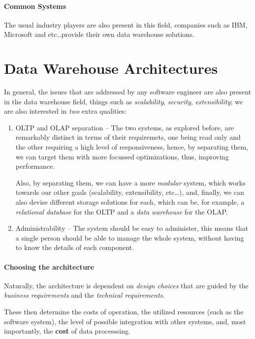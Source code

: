 \documentclass[openright, twoside, twocolumn]{report}
\begin{document}
\paragraph{Common Systems}
The usual industry players are also present in this field, companies such as
IBM, Microsoft and etc\dots provide their own data warehouse solutions.

\section{Data Warehouse Architectures}
In general, the issues that are addressed by any software engineer are
also present in the data warehouse field, things such as \emph{scalability},
\emph{security}, \emph{extensibility}; we are also interested in
\emph{two} extra qualities:

\begin{enumerate}
  \item OLTP and OLAP separation -- The two systems, as explored before,
  are remarkably distinct in terms of their requiremets, one being read only
  and the other requiring a high level of responsiveness, hence, by separating them,
  we can target them with more focussed optimizations, thus, improving performance.

  Also, by separating them, we can have a more \emph{modular} system, which works
  towards our other goals (scalability, extensibility, etc\dots), and, finally,
  we can also devise different storage solutions for each, which can be, for example,
  a \emph{relational database} for the OLTP and a \emph{data warehouse} for the OLAP.
  \item Administrability -- The system should be easy to administer, this means that
  a single person should be able to manage the whole system, without having to
  know the details of each component.
\end{enumerate}

\paragraph{Choosing the architecture}
Naturally, the architecture is dependent on \emph{design choices} that are
guided by the \emph{business requirements} and the \emph{technical requirements}.

These then determine the costs of operation, the utilized resources (such as
the software system), the level of possible integration with other systems, and,
most importantly, the \textbf{cost} of data processsing.
\end{document}

